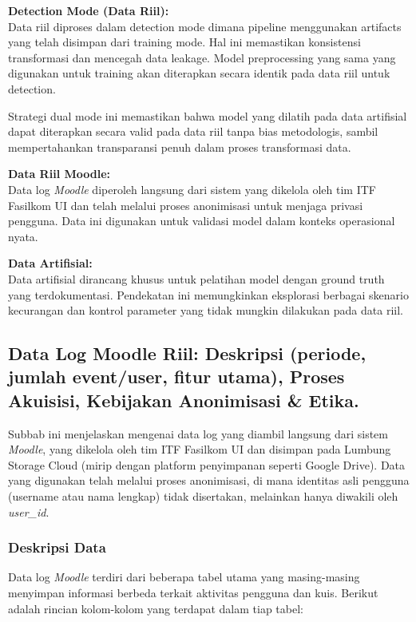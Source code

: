 \textbf{Detection Mode (Data Riil):} \\
Data riil diproses dalam detection mode dimana pipeline menggunakan artifacts yang telah disimpan dari training mode. Hal ini memastikan konsistensi transformasi dan mencegah data leakage. Model preprocessing yang sama yang digunakan untuk training akan diterapkan secara identik pada data riil untuk detection.

Strategi dual mode ini memastikan bahwa model yang dilatih pada data artifisial dapat diterapkan secara valid pada data riil tanpa bias metodologis, sambil mempertahankan transparansi penuh dalam proses transformasi data.

\textbf{Data Riil Moodle:} \\
Data log \textit{Moodle} diperoleh langsung dari sistem yang dikelola oleh tim ITF Fasilkom UI dan telah melalui proses anonimisasi untuk menjaga privasi pengguna. Data ini digunakan untuk validasi model dalam konteks operasional nyata.

\textbf{Data Artifisial:} \\
Data artifisial dirancang khusus untuk pelatihan model dengan ground truth yang terdokumentasi. Pendekatan ini memungkinkan eksplorasi berbagai skenario kecurangan dan kontrol parameter yang tidak mungkin dilakukan pada data riil.

\subsection{Data Log Moodle Riil: Deskripsi (periode, jumlah event/user, fitur utama), Proses Akuisisi, Kebijakan Anonimisasi \& Etika.}
\label{sec:logRiil}
Subbab ini menjelaskan mengenai data log yang diambil langsung dari sistem \textit{Moodle}, yang dikelola oleh tim ITF Fasilkom UI dan disimpan pada Lumbung Storage Cloud (mirip dengan platform penyimpanan seperti Google Drive). Data yang digunakan telah melalui proses anonimisasi, di mana identitas asli pengguna (username atau nama lengkap) tidak disertakan, melainkan hanya diwakili oleh \textit{user\_id}.

\subsubsection{Deskripsi Data}
\label{sec:deskripsiData}
Data log \textit{Moodle} terdiri dari beberapa tabel utama yang masing-masing menyimpan informasi berbeda terkait aktivitas pengguna dan kuis. Berikut adalah rincian kolom-kolom yang terdapat dalam tiap tabel:

